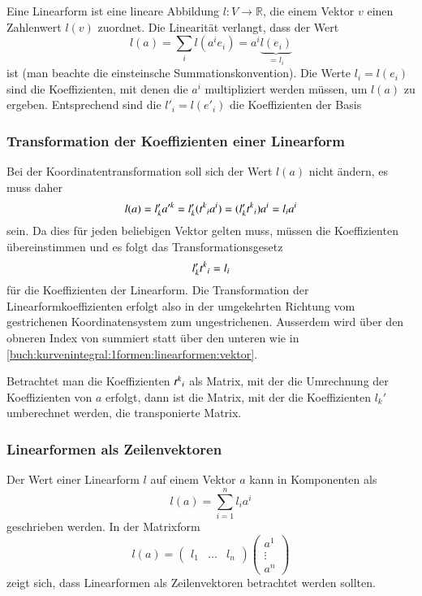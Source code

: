 Eine Linearform ist eine lineare Abbildung $l\colon V\to\mathbb{R}$,
die einem Vektor $v$ einen Zahlenwert $l(v)$ zuordnet.
Die Linearität verlangt, dass der Wert
\[
l(a)
=
\sum_i
l(a^ie_i)
=
a^i \underbrace{l(e_i)}_{\displaystyle=l_i}
\]
ist (man beachte die einsteinsche Summationskonvention).
Die Werte $l_i=l(e_i)$ sind die Koeffizienten, mit denen die $a^i$
multipliziert werden müssen, um $l(a)$ zu ergeben.
Entsprechend sind die $l'_i=l(e'_i)$ die Koeffizienten der Basis

%
%
\subsubsection{Transformation der Koeffizienten einer Linearform}
Bei der Koordinatentransformation soll sich der Wert $l(a)$ nicht
ändern, es muss daher
\[
l(a)
=
l'_k
a'^k
=
l'_k
(t^k\mathstrut _i a^i)
=
(l'_kt^k\mathstrut_i) a^i
=
l_i
a^i
\]
sein.
Da dies für jeden beliebigen Vektor gelten muss, müssen die Koeffizienten
übereinstimmen und es folgt das Transformationsgesetz
\begin{equation}
l'_kt^k\mathstrut_i
=
l_i
\label{buch:kurvenintegral:1formen:linearformen:linearform}
\end{equation}
für die Koeffizienten der Linearform.
Die Transformation der Linearformkoeffizienten erfolgt also
in der umgekehrten Richtung vom gestrichenen Koordinatensystem 
zum ungestrichenen.
Ausserdem wird über den obneren Index von summiert statt über
den unteren wie in 
\eqref{buch:kurvenintegral:1formen:linearformen:vektor}.

Betrachtet man die Koeffizienten $t^k\mathstrut_i$ als Matrix, mit der
die Umrechnung der Koeffizienten von $a$ erfolgt, dann ist die Matrix,
mit der die Koeffizienten $l_k'$ umberechnet werden, die transponierte
Matrix.

%
%
\subsubsection{Linearformen als Zeilenvektoren}
Der Wert einer Linearform $l$ auf einem Vektor $a$ kann in Komponenten
als
\[
l(a) = \sum_{i=1}^n l_ia^i
\]
geschrieben werden.
In der Matrixform
\[
l(a)
=
\begin{pmatrix}l_1&\dots&l_n\end{pmatrix}
\begin{pmatrix}
a^1\\[-2pt]
\vdots\\
a^n
\end{pmatrix}
\]
zeigt sich, dass Linearformen als Zeilenvektoren betrachtet werden
sollten.

